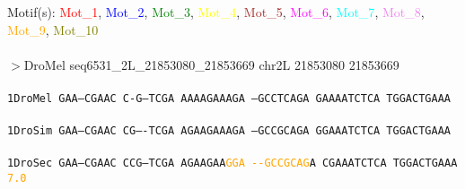 \documentclass[11pt,twoside,reqno,a4paper]{article}
\begin{document}
\noindent
\newlength{\charwidth}Motif(s): \textcolor{red}{Mot\_1}, \textcolor{blue}{Mot\_2}, \textcolor{green}{Mot\_3}, \textcolor{yellow}{Mot\_4}, \textcolor{brown}{Mot\_5}, \textcolor{magenta}{Mot\_6}, \textcolor{cyan}{Mot\_7}, \textcolor{violet}{Mot\_8}, \textcolor{orange}{Mot\_9}, \textcolor{olive}{Mot\_10}\\
\\
$>$DroMel	seq6531\_2L\_21853080\_21853669	chr2L	21853080	21853669 \\
 \\
\texttt{1\hspace*{3\charwidth}DroMel	GAA--CGAAC	C-G---TCGA	AAAAGAAAGA	--GCCTCAGA	GAAAATCTCA	TGGACTGAAA	\\
\hspace*{4\charwidth}\hspace*{7\charwidth}\hspace*{1\charwidth}\hspace*{1\charwidth}\hspace*{1\charwidth}\hspace*{1\charwidth}\hspace*{1\charwidth}\hspace*{1\charwidth}\\
1\hspace*{3\charwidth}DroSim	GAA--CGAAC	CG----TCGA	AGAAGAAAGA	--GCCGCAGA	GGAAATCTCA	TGGACTGAAA	\\
\hspace*{4\charwidth}\hspace*{7\charwidth}\hspace*{1\charwidth}\hspace*{1\charwidth}\hspace*{1\charwidth}\hspace*{1\charwidth}\hspace*{1\charwidth}\hspace*{1\charwidth}\\
1\hspace*{3\charwidth}DroSec	GAA--CGAAC	CCG---TCGA	AGAAGAA\textcolor{orange}{G}\textcolor{orange}{G}\textcolor{orange}{A}	\textcolor{orange}{-}\textcolor{orange}{-}\textcolor{orange}{G}\textcolor{orange}{C}\textcolor{orange}{C}\textcolor{orange}{G}\textcolor{orange}{C}\textcolor{orange}{A}\textcolor{orange}{G}A	CGAAATCTCA	TGGACTGAAA	\\
\hspace*{4\charwidth}\hspace*{7\charwidth}\hspace*{1\charwidth}\hspace*{1\charwidth}\hspace*{27\charwidth}\textcolor{orange}{7.0}\hspace*{1\charwidth}\hspace*{1\charwidth}\hspace*{1\charwidth}\hspace*{1\charwidth}\\
}
\end{document}
